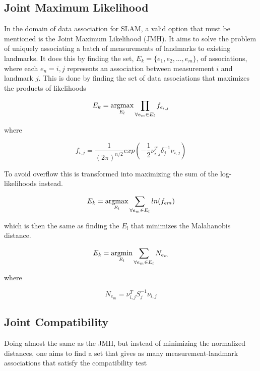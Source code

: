\subsection{Joint Maximum Likelihood}

In the domain of data association for SLAM, a valid option that must be mentioned is the Joint Maximum Likelihood (JMH)\cite{JMH}. It aims to solve the problem of uniquely associating a batch of measurements of landmarks to existing landmarks. It does this by finding the set, $E_k = \{ e_1, e_2, ... , e_m\} $, of associations, where each $e_n = {i,j}$ represents an association between measurement $i$ and landmark $j$. This is done by finding the set of data associations that maximizes the products of likelihoods

\begin{equation}
    E_k = \operatorname*{argmax}_{E_l} \prod_{\forall e_m \in E_l} f_{e_{i,j}}
\end{equation}

where 

\begin{equation}
    f_{i,j} = \frac{1}{(2\pi)^{n/2}} exp(-\frac{1}{2}\nu_{i,j}^T\delta_j^{-1}\nu_{i,j})
\end{equation}

To avoid overflow this is transformed into maximizing the sum of the log-likelihoods instead.

\begin{equation}
    E_k = \operatorname*{argmax}_{E_l} \sum_{\forall e_m \in E_l} ln(f_{em})
\end{equation}

which is then the same as finding the $E_l$ that minimizes the Malahanobis distance.

\begin{equation}
    E_k = \operatorname*{argmin}_{E_l} \sum_{\forall e_m \in E_l} N_{e_m}
\end{equation}

where 

\begin{equation}
    N_{e_m} = \nu_{i,j}^TS_j^{-1}\nu_{i,j} 
\end{equation}

\subsection{Joint Compatibility}

Doing almost the same as the JMH, but instead of minimizing the normalized distances, one aims to find a set that gives as many measurement-landmark associations that satisfy the compatibility test

